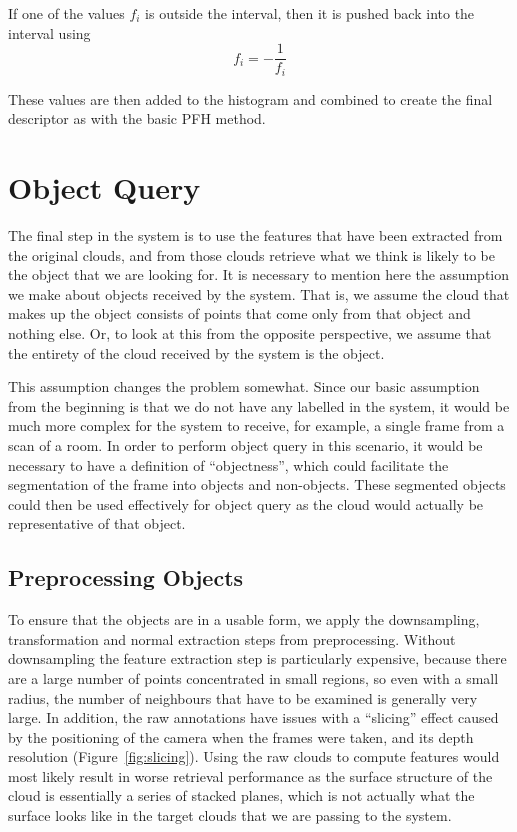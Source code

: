 \documentclass[11pt,a4paper]{kth-mag}
\begin{document}
If one of the values $f_i$ is outside the interval, then it is pushed back into
the interval using
\begin{equation}
  \label{eq:23}
  f_i=-\frac{1}{f_i}
\end{equation}

These values are then added to the histogram and combined to create the final
descriptor as with the basic PFH method.

\chapter{Object Query}
\label{chap:query}
The final step in the system is to use the features that have been extracted
from the original clouds, and from those clouds retrieve what we think is likely
to be the object that we are looking for. It is necessary to mention here the
assumption we make about objects received by the system. That is, we assume the
cloud that makes up the object consists of points that come only from that
object and nothing else. Or, to look at this from the opposite perspective, we
assume that the entirety of the cloud received by the system is the object.

This assumption changes the problem somewhat. Since our basic assumption from
the beginning is that we do not have any labelled in the system, it would be
much more complex for the system to receive, for example, a single frame from
a scan of a room. In order to perform object query in this scenario, it would be
necessary to have a definition of ``objectness'', which could facilitate the
segmentation of the frame into objects and non-objects. These segmented objects
could then be used effectively for object query as the cloud would actually be
representative of that object.

\section{Preprocessing Objects}
To ensure that the objects are in a usable form, we apply the downsampling,
transformation and normal extraction steps from preprocessing. Without
downsampling the feature extraction step is particularly expensive, because
there are a large number of points concentrated in small regions, so even with a
small radius, the number of neighbours that have to be examined is generally
very large. In addition, the raw annotations have issues with a ``slicing''
effect caused by the positioning of the camera when the frames were taken, and
its depth resolution (Figure~\ref{fig:slicing}). Using the raw clouds to compute
features would most likely result in worse retrieval performance as the surface
structure of the cloud is essentially a series of stacked planes, which is not
actually what the surface looks like in the target clouds that we are passing to
the system.
\end{document}
